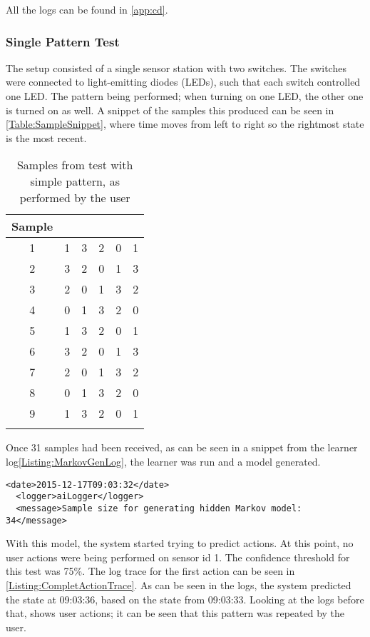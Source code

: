 All the logs can be found in \cref{app:cd}. 
\subsubsection{Single Pattern Test}
The setup consisted of a single sensor station with two switches. The switches were connected to light-emitting diodes (LEDs), such that each switch controlled one LED. The pattern being performed; when turning on one LED, the other one is turned on as well. A snippet of the samples this produced can be seen in \cref{Table:SampleSnippet}, where time moves from left to right so the rightmost state is the most recent.
\begin{center}

\begin{table}[htbp]
  \centering
  \begin{tabular}{c c c c c c}
    \toprule
    Sample & & & & &  \\ \midrule
    1 & 1 & 3 & 2 & 0 & 1 \\
    2 & 3 & 2 & 0 & 1 & 3 \\
    3 & 2 & 0 & 1 & 3 & 2 \\
    4 & 0 & 1 & 3 & 2 & 0 \\
    5 & 1 & 3 & 2 & 0 & 1 \\
    6 & 3 & 2 & 0 & 1 & 3 \\
    7 & 2 & 0 & 1 & 3 & 2 \\
    8 & 0 & 1 & 3 & 2 & 0 \\
    9 & 1 & 3 & 2 & 0 & 1 \\
     \\ \bottomrule
  \end{tabular}
  \caption{Samples from test with simple pattern, as performed by the user}
\end{table}

\label{Table:SampleSnippet}
\end{center}
Once 31 samples had been received, as can be seen in a snippet from the learner log\cref{Listing:MarkovGenLog}, the learner was run and a model generated.
\lstset{language=xml}
\begin{lstlisting}[label = Listing:MarkovGenLog, caption = Snippet of log from model generation]
  <date>2015-12-17T09:03:32</date>
  <logger>aiLogger</logger>
  <message>Sample size for generating hidden Markov model: 34</message>
\end{lstlisting}
With this model, the system started trying to predict actions. At this point, no user actions were being performed on sensor id 1. The confidence threshold for this test was 75\%. The log trace for the first action can be seen in \cref{Listing:CompletActionTrace}. As can be seen in the logs, the system predicted the state at 09:03:36, based on the state from 09:03:33. Looking at the logs before that, shows user actions; it can be seen that this pattern was repeated by the user.

